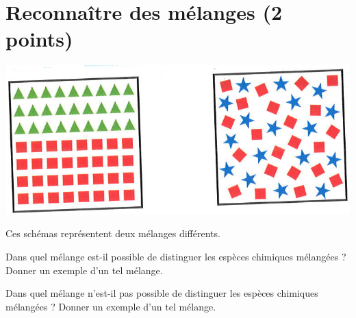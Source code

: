 \section{Reconnaître des mélanges (2 points)}\label{ex:melanges}

\begin{center}
	\includegraphics[scale=0.4]{img/melanges}
\end{center}

Ces schémas représentent deux mélanges différents.

\begin{questions}
	\question[1] Dans quel mélange est-il possible de distinguer les espèces chimiques mélangées ? Donner un exemple d'un tel mélange.
	
	\question[1] Dans quel mélange n'est-il pas possible de distinguer les espèces chimiques mélangées ? Donner un exemple d'un tel mélange.
\end{questions}